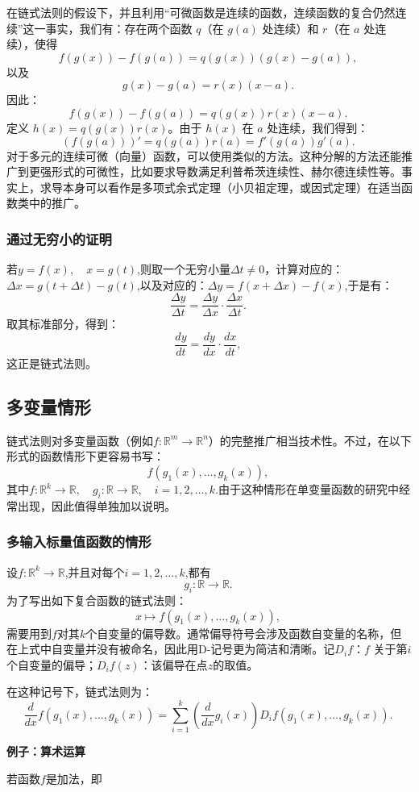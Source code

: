 在链式法则的假设下，并且利用“可微函数是连续的函数，连续函数的复合仍然连续”这一事实，我们有：存在两个函数 $q$（在 $g(a)$ 处连续）和 $r$（在 $a$ 处连续），使得
$$
f(g(x)) - f(g(a)) = q(g(x))(g(x) - g(a)),~
$$
以及
$$
g(x) - g(a) = r(x)(x-a).~
$$
因此：
$$
f(g(x)) - f(g(a)) = q(g(x))r(x)(x-a).~
$$
定义 $h(x) = q(g(x))r(x)$。由于 $h(x)$ 在 $a$ 处连续，我们得到：
$$
(f(g(a)))' = q(g(a))r(a) = f'(g(a))g'(a).~
$$
对于多元的连续可微（向量）函数，可以使用类似的方法。这种分解的方法还能推广到更强形式的可微性，比如要求导数满足利普希茨连续性、赫尔德连续性等。事实上，求导本身可以看作是多项式余式定理（小贝祖定理，或因式定理）在适当函数类中的推广。
\subsubsection{通过无穷小的证明}
若$y = f(x), \quad x = g(t)$,则取一个无穷小量$\Delta t \neq 0$，计算对应的：$\Delta x = g(t+\Delta t) - g(t)$,以及对应的：$\Delta y = f(x+\Delta x) - f(x)$,于是有：
$$
\frac{\Delta y}{\Delta t} = \frac{\Delta y}{\Delta x} \cdot \frac{\Delta x}{\Delta t}.~
$$
取其标准部分，得到：
$$
\frac{dy}{dt} = \frac{dy}{dx} \cdot \frac{dx}{dt},~
$$
这正是链式法则。
\subsection{多变量情形}
链式法则对多变量函数（例如$f: \mathbb{R}^m \to \mathbb{R}^n$）的完整推广相当技术性。不过，在以下形式的函数情形下更容易书写：
$$
f(g_{1}(x), \dots, g_{k}(x)),~
$$
其中$f: \mathbb{R}^k \to \mathbb{R},\quad g_i: \mathbb{R} \to \mathbb{R}, \quad i=1,2,\dots,k$.由于这种情形在单变量函数的研究中经常出现，因此值得单独加以说明。
\subsubsection{多输入标量值函数的情形}
设$f: \mathbb{R}^k \to \mathbb{R}$,并且对每个$i = 1, 2, \dots, k$,都有
$$
g_i: \mathbb{R} \to \mathbb{R}.~
$$
为了写出如下复合函数的链式法则：
$$
x \mapsto f(g_1(x), \dots, g_k(x)),~
$$
需要用到$f$对其$k$个自变量的偏导数。通常偏导符号会涉及函数自变量的名称，但在上式中自变量并没有被命名，因此用D-记号更为简洁和清晰。记$D_i f$：$f$ 关于第$i$个自变量的偏导；$D_i f(z)$：该偏导在点$z$的取值。

在这种记号下，链式法则为：
$$
\frac{d}{dx} f(g_1(x), \dots, g_k(x)) 
= \sum_{i=1}^k \left( \frac{d}{dx} g_i(x) \right) D_i f(g_1(x), \dots, g_k(x)).~
$$

\textbf{例子：算术运算}

若函数$f$是加法，即

